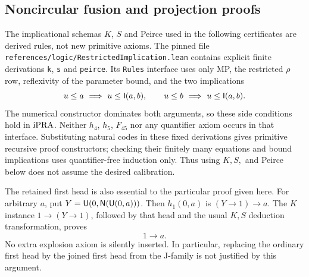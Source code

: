 \subsection{Noncircular fusion and projection proofs}

The implicational schemas $K$, $S$ and Peirce used in the following
certificates are derived rules, not new primitive axioms.  The pinned file
\nolinkurl{references/logic/RestrictedImplication.lean} contains explicit
finite derivations \texttt{k}, \texttt{s} and \texttt{peirce}.  Its
\texttt{Rules} interface uses only MP, the restricted $\rho$ row,
reflexivity of the parameter bound, and the two implications
\[
 u\le a\ \Longrightarrow\ u\le\mathsf I(a,b),\qquad
 u\le b\ \Longrightarrow\ u\le\mathsf I(a,b).
\]
The numerical constructor dominates both arguments, so these side
conditions hold in $\mathrm{iPRA}$.  Neither $h_4$, $h_5$, $F_{45}$ nor any
quantifier axiom occurs in that interface.  Substituting natural codes
in these fixed derivations gives primitive recursive proof constructors;
checking their finitely many equations and bound implications uses
quantifier-free induction only.  Thus using $K,S,$ and Peirce below
does not assume the desired calibration.

The retained first head is also essential to the particular proof given
here.  For arbitrary $a$, put $Y=\mathsf U(0,\mathsf N(\mathsf U(0,a)))$.
Then $h_1(0,a)$ is $(Y\to1)\to a$.  The $K$ instance
$1\to(Y\to1)$, followed by that head and the usual $K,S$ deduction
transformation, proves
\[
                         1\to a.                         \tag{FW-Ex}
\]
No extra explosion axiom is silently inserted.  In particular, replacing
the ordinary first head by the joined first head from the J-family is
not justified by this argument.

